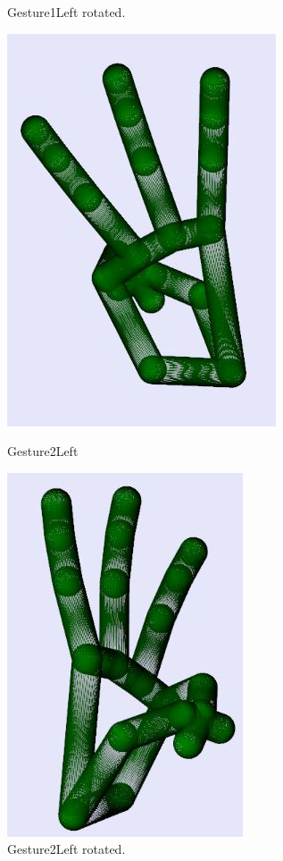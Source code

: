 \begin{figure}[H]
\begin{minipage}{0.5\textwidth}
        \caption[Gesture1Left Rotated]{Gesture1Left rotated.}
        \label{fig:Gesture1Left_rotated}
    \end{minipage}
\end{figure}

\begin{figure}[H]
    \centering
    \begin{minipage}{0.5\textwidth}
        \centering
        \includegraphics[scale=.75]{Figures/gesture2Left.JPG} 
        \caption[Gesture2Left]{Gesture2Left}
		\label{fig:Gesture2Left}
    \end{minipage}\hfill
    \begin{minipage}{0.5\textwidth}
        \centering
        \includegraphics[scale=.75]{Figures/gesture2Left_rotated.JPG}
        \caption[Gesture2Left Rotated]{Gesture2Left rotated.}
        \label{fig:Gesture2Left_rotated}
    \end{minipage}
\end{figure}

